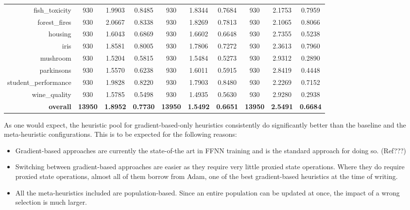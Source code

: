 \begin{table}[htbp]
{\begin{tabular}{rccccccccc}
    fish\_toxicity & 930   & 1.9903 & 0.8485 & 930   & \cellcolor[rgb]{ .776,  .937,  .808}\textcolor[rgb]{ 0,  .38,  0}{1.8344} & 0.7684 & 930   & 2.1753 & 0.7959 \\
    forest\_fires & 930   & 2.0667 & 0.8338 & 930   & \cellcolor[rgb]{ .776,  .937,  .808}\textcolor[rgb]{ 0,  .38,  0}{1.8269} & 0.7813 & 930   & 2.1065 & 0.8066 \\
    housing & 930   & \cellcolor[rgb]{ .776,  .937,  .808}\textcolor[rgb]{ 0,  .38,  0}{1.6043} & 0.6869 & 930   & 1.6602 & 0.6648 & 930   & 2.7355 & 0.5238 \\
    iris  & 930   & 1.8581 & 0.8005 & 930   & \cellcolor[rgb]{ .776,  .937,  .808}\textcolor[rgb]{ 0,  .38,  0}{1.7806} & 0.7272 & 930   & 2.3613 & 0.7960 \\
    mushroom & 930   & \cellcolor[rgb]{ .776,  .937,  .808}\textcolor[rgb]{ 0,  .38,  0}{1.5204} & 0.5815 & 930   & 1.5484 & 0.5273 & 930   & 2.9312 & 0.2890 \\
    parkinsons & 930   & \cellcolor[rgb]{ .776,  .937,  .808}\textcolor[rgb]{ 0,  .38,  0}{1.5570} & 0.6238 & 930   & 1.6011 & 0.5915 & 930   & 2.8419 & 0.4448 \\
    student\_performance & 930   & 1.9828 & 0.8220 & 930   & \cellcolor[rgb]{ .776,  .937,  .808}\textcolor[rgb]{ 0,  .38,  0}{1.7903} & 0.8480 & 930   & 2.2269 & 0.7152 \\
    wine\_quality & 930   & 1.5785 & 0.5498 & 930   & \cellcolor[rgb]{ .776,  .937,  .808}\textcolor[rgb]{ 0,  .38,  0}{1.4935} & 0.5630 & 930   & 2.9280 & 0.2938 \\
    \midrule
    \textbf{overall} & \textbf{13950} & \textbf{1.8952} & \textbf{0.7730} & \textbf{13950} & \cellcolor[rgb]{ .776,  .937,  .808}\textcolor[rgb]{ 0,  .38,  0}{\textbf{1.5492}} & \textbf{0.6651} & \textbf{13950} & \textbf{2.5491} & \textbf{0.6684} \\
    \end{tabular}%
    }
\end{table}%

As one would expect, the heuristic pool for gradient-based-only heuristics consistently do significantly better than the baseline and the meta-heuristic configurations. This is to be expected for the following reasons:

\begin{itemize}
    \item Gradient-based approaches are currently the state-of-the art in \Ac{FFNN} training and is the standard approach for doing so. (Ref???)
    
    \item Switching between gradient-based approaches are easier as they require very little proxied state operations. Where they do require proxied state operations, almost all of them borrow from \Ac{Adam}, one of the best gradient-based heuristics at the time of writing.
    
    \item All the meta-heuristics included are population-based. Since an entire population can be updated at once, the impact of a wrong selection is much larger.
\end{itemize}

